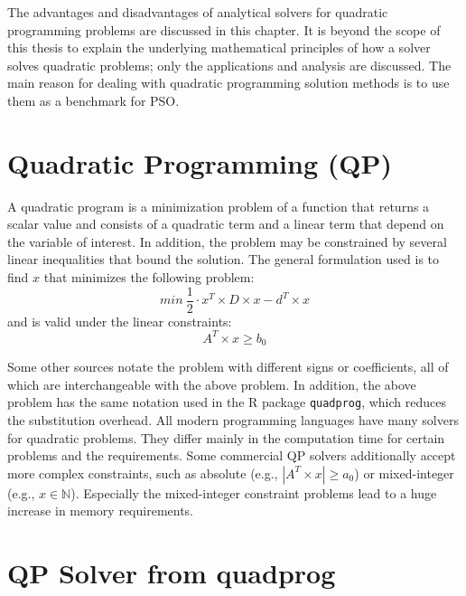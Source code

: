 \documentclass[
  oneside]{book}
\begin{document}
The advantages and disadvantages of analytical solvers for quadratic programming problems are discussed in this chapter. It is beyond the scope of this thesis to explain the underlying mathematical principles of how a solver solves quadratic problems; only the applications and analysis are discussed. The main reason for dealing with quadratic programming solution methods is to use them as a benchmark for PSO.

\hypertarget{quadratic-programming-qp}{%
\section{Quadratic Programming (QP)}\label{quadratic-programming-qp}}

A quadratic program is a minimization problem of a function that returns a scalar value and consists of a quadratic term and a linear term that depend on the variable of interest. In addition, the problem may be constrained by several linear inequalities that bound the solution. The general formulation used is to find \(x\) that minimizes the following problem:
\[
  min \ \frac{1}{2} \cdot x^T \times D \times x - d^T \times x 
\]
and is valid under the linear constraints:
\[
  A^T \times x \geq b_0
\]

Some other sources notate the problem with different signs or coefficients, all of which are interchangeable with the above problem. In addition, the above problem has the same notation used in the R package \texttt{quadprog}, which reduces the substitution overhead. All modern programming languages have many solvers for quadratic problems. They differ mainly in the computation time for certain problems and the requirements. Some commercial QP solvers additionally accept more complex constraints, such as absolute (e.g., \(|A^T \times x| \geq a_0\)) or mixed-integer (e.g., \(x \in \mathbb{N}\)). Especially the mixed-integer constraint problems lead to a huge increase in memory requirements.

\hypertarget{qp-solver-from-quadprog}{%
\section{QP Solver from quadprog}\label{qp-solver-from-quadprog}}
\end{document}
